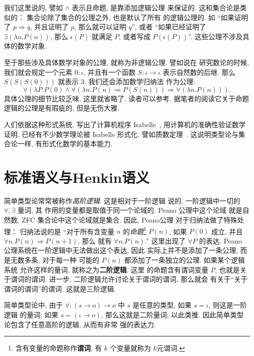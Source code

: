 我们这里说的, 譬如 \(\wedge\) 表示且命题, 是靠添加逻辑公理
来保证的. 这和集合论是类似的： 集合论除了集合的公理之外,
也是默认了所有
的逻辑公理的. 如 “如果证明了 \(p \Rightarrow q\), 并且证明了
\(p\), 那么就可以证明 \(q\)”, 或者 “如果已经证明了 \(\exists
(\lambda n. P(n))\), 那么 \(\epsilon(P)\) 就满足 \(P\),
或者写成 \(P(\epsilon(P))\)”.
这些公理不涉及具体的数学对象.

至于那些涉及具体数学对象的公理, 就称为非逻辑公理. 譬如说在
研究数论的时候, 我们就会规定一个元素 \(0 : \iota\),
并且有一个函数 \(S : \iota \to \iota\) 表示自然数的后继.
那么 \(S(S(S(0)))\) 就表示 \(3\). 我们还会添加数学归纳法
作为公理:
\[\forall (\lambda P. P(0) \wedge
\forall(\lambda n. P(n)\Rightarrow P(S(n)))
\Rightarrow \forall (\lambda n. P(n))).\]
具体公理的细节比较乏味, 这里就省略了. 读者可以参考\cite{farmer:2008:virtues}.
据笔者的阅读它关于命题逻辑的公理是有瑕疵的, 但是无伤大雅.

人们依据这种形式系统, 写出了计算机程序 Isabelle~\cite{tobias:2002:isabelle},
用计算机的准确性验证数学证明. 已经有不少数学理论被 Isabelle 形式化.
譬如质数定理~\cite{eberl:2018:pnt}. 这说明类型论与集合论一样,
有形式化数学的基本能力.

\section{标准语义与Henkin语义}\label{beginning:henkin}
简单类型论常常被称作\emph{高阶逻辑}. 这是相对于一阶逻辑
说的. 一阶逻辑中一切的 \(\forall, \exists\) 量词, 其
作用的变量都是取值于同一个论域的. Peano 公理中这个论域
就是自然数, ZFC 集合论中这个论域就是集合. 因此, Peano公理
对于归纳法做了特殊处理： 归纳法说的是 “对于所有含变量
\(n\) 的\emph{命题}\footnote{含有变量的命题称作\textbf{谓词},
有 \(k\) 个变量就称为 \(k\)元谓词.}
\(P(n)\), 如果 \(P(0)\) 成立,
并且 \(\forall n. P(n) \Rightarrow P(n+1)\), 那么
就有 \(\forall n. P(n)\).” 这里出现了 \(\forall P\)
的表达. Peano 公理系统在一阶逻辑中无法做出这个表达, 因此
实际上并不是添加了一条公理, 而是无数多条, 对于每一种
可能的 \(P(n)\) 都添加了一条独立的公理. 如果某个逻辑系统
允许这样的量词, 就称之为\textbf{二阶逻辑}. 这里
的命题含有谓词变量 \(P\), 也就是关于谓词的谓词.
进一步, 二阶逻辑允许讨论关于谓词的谓词, 那么就会
有关于“关于谓词的谓词”的谓词. 这就是三阶逻辑.

简单类型论中, 由于 \(\forall : (s \to o) \to o\) 中
\(s\) 是任意的类型, 如果 \(s = \iota\), 则这是一阶逻辑
的量词; 如果 \(s = (\iota \to o)\), 那么这就是二阶量词;
以此类推. 因此简单类型论包含了任意高阶的逻辑, 从而有非常
强的表达力.

